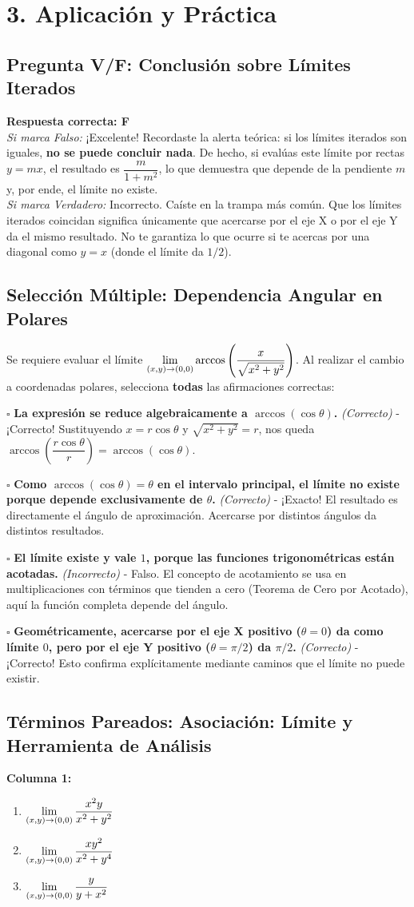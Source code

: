 \documentclass[11pt]{article}
\newenvironment{aplicacion}{%
  \section*{3. Aplicación y Práctica}%
}{}
\newenvironment{preguntaverdaderofalso}[1]{\subsection*{Pregunta V/F: #1}\par\vspace{0.1cm}}{\vspace{0.3cm}}
\newcommand{\verdaderofalso}[3]{\par\noindent\textbf{Respuesta correcta: #1} \\ \textit{Si marca Falso:} #2 \\ \textit{Si marca Verdadero:} #3\par\vspace{0.15cm}}
\newenvironment{preguntacasillas}[1]{\subsection*{Selección Múltiple: #1}\par\vspace{0.1cm}}{\vspace{0.3cm}}
\newcommand{\casilla}[3]{\par\noindent $\square$ \textbf{#1} \textit{(#2)} - #3\par\vspace{0.15cm}}
\newenvironment{pareados}[1]{\subsection*{Términos Pareados: #1}}{\vspace{0.3cm}}
\newcommand{\columnaI}[1]{\textbf{Columna 1:}\begin{enumerate}#1\end{enumerate}}
\begin{document}
\begin{aplicacion}
\begin{preguntaverdaderofalso}{Conclusión sobre Límites Iterados}
    \verdaderofalso{F}
      {¡Excelente! Recordaste la alerta teórica: si los límites iterados son iguales, \textbf{no se puede concluir nada}. De hecho, si evalúas este límite por rectas $y = mx$, el resultado es $\dfrac{m}{1+m^2}$, lo que demuestra que depende de la pendiente $m$ y, por ende, el límite no existe.}
      {Incorrecto. Caíste en la trampa más común. Que los límites iterados coincidan significa únicamente que acercarse por el eje X o por el eje Y da el mismo resultado. No te garantiza lo que ocurre si te acercas por una diagonal como $y=x$ (donde el límite da $1/2$).}
  \end{preguntaverdaderofalso}

  \begin{preguntacasillas}{Dependencia Angular en Polares}
    Se requiere evaluar el límite $\displaystyle \displaystyle\lim_{(x,y) \to (0,0)} \arccos\left(\dfrac{x}{\sqrt{x^2 + y^2}}\right)$. Al realizar el cambio a coordenadas polares, selecciona \textbf{todas} las afirmaciones correctas:
    
    \casilla{La expresión se reduce algebraicamente a $\arccos(\cos\theta)$.}{Correcto}{¡Correcto! Sustituyendo $x = r\cos\theta$ y $\sqrt{x^2+y^2} = r$, nos queda $\arccos(\dfrac{r\cos\theta}{r}) = \arccos(\cos\theta)$.}
    \casilla{Como $\arccos(\cos\theta) = \theta$ en el intervalo principal, el límite no existe porque depende exclusivamente de $\theta$.}{Correcto}{¡Exacto! El resultado es directamente el ángulo de aproximación. Acercarse por distintos ángulos da distintos resultados.}
    \casilla{El límite existe y vale $1$, porque las funciones trigonométricas están acotadas.}{Incorrecto}{Falso. El concepto de acotamiento se usa en multiplicaciones con términos que tienden a cero (Teorema de Cero por Acotado), aquí la función completa depende del ángulo.}
    \casilla{Geométricamente, acercarse por el eje X positivo ($\theta=0$) da como límite $0$, pero por el eje Y positivo ($\theta=\pi/2$) da $\pi/2$.}{Correcto}{¡Correcto! Esto confirma explícitamente mediante caminos que el límite no puede existir.}
  \end{preguntacasillas}

  \begin{pareados}{Asociación: Límite y Herramienta de Análisis}
    
    \columnaI{
      \item $\displaystyle \displaystyle\lim_{(x,y)\to(0,0)} \dfrac{x^2y}{x^2+y^2}$
      \item $\displaystyle \displaystyle\lim_{(x,y)\to(0,0)} \dfrac{xy^2}{x^2+y^4}$
      \item $\displaystyle \displaystyle\lim_{(x,y)\to(0,0)} \dfrac{y}{y+x^2}$
    }
    

\end{pareados}
\end{aplicacion}
\end{document}

